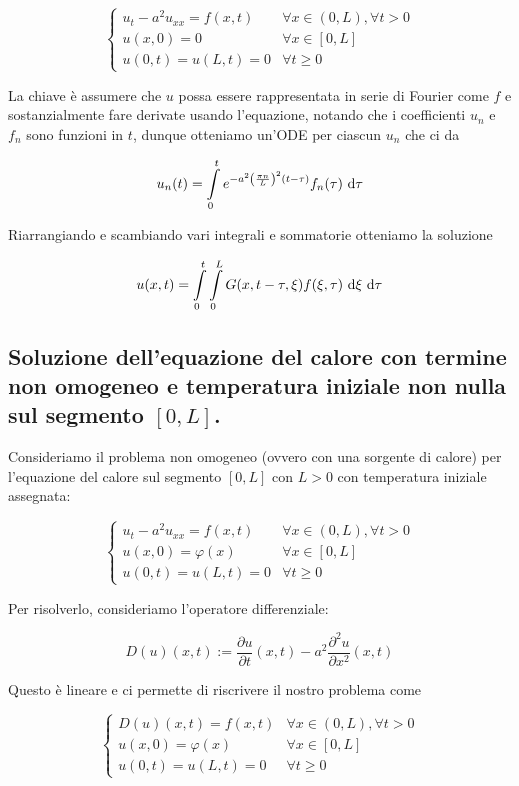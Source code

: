 \documentclass{article}
\begin{document}
\[ \begin{cases} u_t - a^2 u_{xx} = f(x,t) & \forall x \in (0,L), \forall t > 0 \\ u(x,0) = 0 & \forall x \in [0,L] \\ u(0,t) = u(L,t) = 0 & \forall t \ge 0 \end{cases}\]

La chiave è assumere che $u$ possa essere rappresentata in serie di Fourier come $f$ e sostanzialmente fare derivate usando l'equazione, notando che i coefficienti $u_n$ e $f_n$ sono funzioni in $t$, dunque otteniamo un'ODE per ciascun $u_n$ che ci da

\[ u_n(t) = \intop_0^t e^{-a^2\left( \frac{\pi n}{L} \right)^2 (t-\tau)} f_n(\tau) \de\tau \]

Riarrangiando e scambiando vari integrali e sommatorie otteniamo la soluzione

\[ u(x,t) = \intop_0^t\intop_0^L G(x,t-\tau,\xi)f(\xi,\tau)\de\xi\de\tau \]

\subsection{Soluzione dell'equazione del calore con termine non omogeneo e temperatura iniziale non nulla sul segmento $[0,L]$.}

Consideriamo il problema non omogeneo (ovvero con una sorgente di calore) per l'equazione del calore sul segmento $[0,L]$ con $L>0$ con temperatura iniziale assegnata:

\[ \begin{cases} u_t - a^2 u_{xx} = f(x,t) & \forall x \in (0,L), \forall t > 0 \\ u(x,0) = \varphi(x) & \forall x \in [0,L] \\ u(0,t) = u(L,t) = 0 & \forall t \ge 0 \end{cases}\]

Per risolverlo, consideriamo l'operatore differenziale:

\[ D(u)(x,t) := \frac{\partial u}{\partial t}(x,t) - a^2 \frac{\partial^2 u}{\partial x^2}(x,t) \]

Questo è lineare e ci permette di riscrivere il nostro problema come  

\[ \begin{cases} D(u)(x,t) = f(x,t) & \forall x \in (0,L), \forall t > 0 \\ u(x,0) = \varphi(x) & \forall x \in [0,L] \\ u(0,t) = u(L,t) = 0 & \forall t \ge 0 \end{cases}\]
\end{document}
